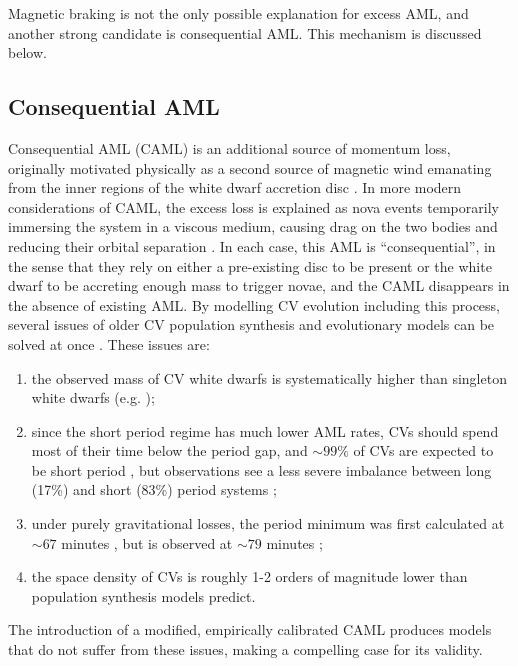 Magnetic braking is not the only possible explanation for excess AML, and another strong candidate is consequential AML. This mechanism is discussed below.


\subsection{Consequential AML}
\label{sect:introduction:CAML}

Consequential AML (CAML) is an additional source of momentum loss, originally motivated physically as a second source of magnetic wind emanating from the inner regions of the white dwarf accretion disc \citep{king1995,schenker1998}. In more modern considerations of CAML, the excess loss is explained as nova events temporarily immersing the system in a viscous medium, causing drag on the two bodies and reducing their orbital separation \citep{Schreiber2016}.
In each case, this AML is ``consequential'', in the sense that they rely on either a pre-existing disc to be present or the white dwarf to be accreting enough mass to trigger novae, and the CAML disappears in the absence of existing AML.
By modelling CV evolution including this process, several issues of older CV population synthesis and evolutionary models can be solved at once \citep{Schreiber2016}. These issues are: 
\begin{enumerate}
    \item the observed mass of CV white dwarfs is systematically higher than singleton white dwarfs (e.g. \citealt{McAllister2019,pala2020});
    \item since the short period regime has much lower AML rates, CVs should spend most of their time below the period gap, and $\sim 99\%$ of CVs are expected to be short period \citep{kolb1993a}, but observations see a less severe imbalance between long (17\%) and short (83\%) period systems \citep{pala2020};
    \item under purely gravitational losses, the period minimum was first calculated at $\sim 67$ minutes \citep{kolb99}, but is observed at $\sim 79$ minutes \citep{McAllister2019};
    \item the space density of CVs is roughly 1-2 orders of magnitude lower than population synthesis models predict.
\end{enumerate} 
The introduction of a modified, empirically calibrated CAML produces models that do not suffer from these issues, making a compelling case for its validity. 

